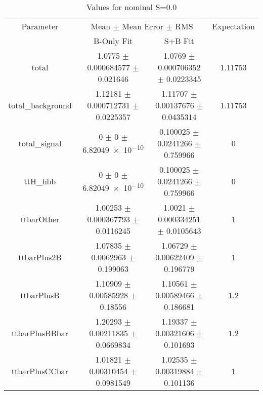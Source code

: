 \begin{table}
\centering
\caption{Values for nominal S=0.0}
\begin{tabular}{cccc}
\toprule
Parameter & \multicolumn{2}{c}{Mean $\pm$ Mean Error $\pm$ RMS} & Expectation\\
 & B-Only Fit & S+B Fit & \\
\midrule
total & \num{1.0775} $\pm$ \num{0.000684577} $\pm$ \num{0.021646} & \num{1.0769} $\pm$ \num{0.000706352} $\pm$ \num{0.0223345} & \num{1.11753}\\
total\_background & \num{1.12181} $\pm$ \num{0.000712731} $\pm$ \num{0.0225357} & \num{1.11707} $\pm$ \num{0.00137676} $\pm$ \num{0.0435314} & \num{1.11753}\\
total\_signal & \num{0} $\pm$ \num{0} $\pm$ \num{6.82049e-10} & \num{0.100025} $\pm$ \num{0.0241266} $\pm$ \num{0.759966} & \num{0}\\
ttH\_hbb & \num{0} $\pm$ \num{0} $\pm$ \num{6.82049e-10} & \num{0.100025} $\pm$ \num{0.0241266} $\pm$ \num{0.759966} & \num{0}\\
ttbarOther & \num{1.00253} $\pm$ \num{0.000367793} $\pm$ \num{0.0116245} & \num{1.0021} $\pm$ \num{0.000334251} $\pm$ \num{0.0105643} & \num{1}\\
ttbarPlus2B & \num{1.07835} $\pm$ \num{0.0062963} $\pm$ \num{0.199063} & \num{1.06729} $\pm$ \num{0.00622409} $\pm$ \num{0.196779} & \num{1}\\
ttbarPlusB & \num{1.10909} $\pm$ \num{0.00585928} $\pm$ \num{0.18556} & \num{1.10561} $\pm$ \num{0.00589466} $\pm$ \num{0.186681} & \num{1.2}\\
ttbarPlusBBbar & \num{1.20293} $\pm$ \num{0.00211835} $\pm$ \num{0.0669834} & \num{1.19337} $\pm$ \num{0.00321606} $\pm$ \num{0.101693} & \num{1.2}\\
ttbarPlusCCbar & \num{1.01821} $\pm$ \num{0.00310454} $\pm$ \num{0.0981549} & \num{1.02535} $\pm$ \num{0.00319884} $\pm$ \num{0.101136} & \num{1}\\
\bottomrule
\end{tabular}
\end{table}